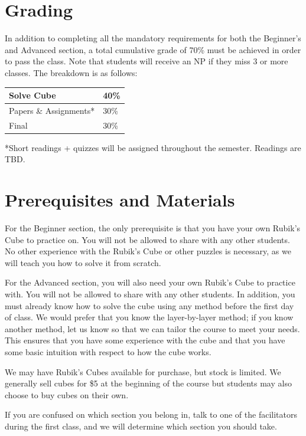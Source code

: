 \documentclass[11pt]{article}
\begin{document}
\section*{Grading}
In addition to completing all the mandatory requirements for both the Beginner’s and Advanced section, a total cumulative grade of 70\% must be achieved in order to pass the class. Note that students will receive an NP if they miss 3 or more classes. The breakdown is as follows:
\begin{center}
\begin{tabular}{|l|l|}
\hline
Solve Cube             & 40\% \\ \hline
Papers \& Assignments* & 30\% \\ \hline
Final                  & 30\% \\ \hline
\end{tabular}
\end{center}
\begin{footnotesize}
*Short readings + quizzes will be assigned throughout the semester. Readings are TBD. 
\end{footnotesize}

\section*{Prerequisites and Materials}
For the Beginner section, the only prerequisite is that you have your own Rubik’s Cube to practice on. You will not be allowed to share with any other students. No other experience with the Rubik’s Cube or other puzzles is necessary, as we will teach you how to solve it from scratch.

For the Advanced section, you will also need your own Rubik’s Cube to practice with. You will not be allowed to share with any other students. In addition, you must already know how to solve the cube using any method before the first day of class. We would prefer that you know the layer-by-layer method; if you know another method, let us know so that we can tailor the course to meet your needs. This ensures that you have some experience with the cube and that you have some basic intuition with respect to how the cube works.

We may have Rubik’s Cubes available for purchase, but stock is limited. We generally sell cubes for \$5 at the beginning of the course but students may also choose to buy cubes on their own.

If you are confused on which section you belong in, talk to one of the facilitators during the first class, and we will determine which section you should take.
\end{document}
